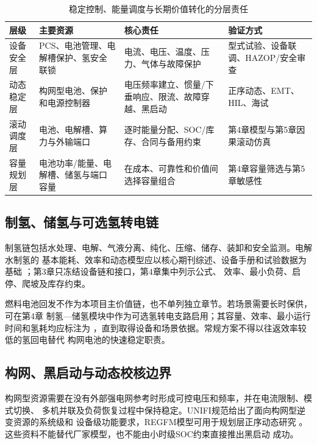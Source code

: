 \begin{table}[H]
\centering
\caption{稳定控制、能量调度与长期价值转化的分层责任}
\label{tab:c3-storage-responsibility}
\begin{tabularx}{\textwidth}{p{2.6cm} p{3cm} X X}
\toprule
{\bfseries 层级} & {\bfseries 主要资源} & {\bfseries 核心责任} & {\bfseries 验证方式}\\
\midrule
设备安全层 & PCS、电池管理、电解槽保护、氢安全联锁 & 电流、电压、温度、压力、气体与故障保护 & 型式试验、设备联调、HAZOP/安全审查\\
动态稳定层 & 构网型电池、保护和电源控制器 & 电压频率建立、惯量/下垂响应、限流、故障穿越、黑启动 & 正序动态、EMT、HIL、海试\\
滚动调度层 & 电池、电解槽、算力与外输端口 & 逐时能量分配、SOC/库存、合同与备用约束 & 第4章模型与第5章因果滚动仿真\\
容量规划层 & 电池功率/能量、电解槽、储氢与端口容量 & 在成本、可靠性和价值间选择容量组合 & 第4章容量筛选与第5章敏感性\\
\bottomrule
\end{tabularx}
\end{table}

\subsection{制氢、储氢与可选氢转电链}

制氢链包括水处理、电解、气液分离、纯化、压缩、储存、装卸和安全监测。电解水制氢的
基本能耗、效率和动态模型应以核心期刊综述、设备手册和试验数据为基础
\cite{ursua2012,carmo2013,buttler2018}；第3章只冻结设备链和接口，第4章集中列示公式、
效率、最小负荷、启停、爬坡及库存约束。

燃料电池回发不作为本项目主价值链，也不单列独立章节。若场景需要长时保供，可在第4章
制氢—储氢模块中作为可选氢转电支路启用；其容量、效率、最小运行时间和氢耗均应标注为
\assumptiontag，直到取得设备和场景依据。常规方案不得以往返效率较低的氢回电替代
构网电池的快速稳定职责。

\subsection{构网、黑启动与动态校核边界}

构网型资源需要在没有外部强电网参考时形成可控电压和频率，并在电流限制、模式切换、
多机并联及负荷恢复过程中保持稳定。UNIFI规范给出了面向构网型逆变资源的系统级和
设备级功能要求\cite{unifi-v3}，REGFM模型可用于规划层正序动态研究
\cite{regfm-b1}。这些资料不能替代厂家模型，也不能由小时级SOC约束直接推出黑启动
成功。

